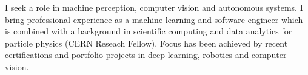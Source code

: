 

\begin{cvparagraph}


I seek a role in machine perception, computer vision and autonomous systems. 
I bring professional experience as a machine learning and software engineer which is combined
with a background in scientific computing and data analytics for particle physics 
(CERN Reseach Fellow). Focus has been achieved by recent certifications 
and portfolio projects in deep learning, robotics and computer vision.

\end{cvparagraph}